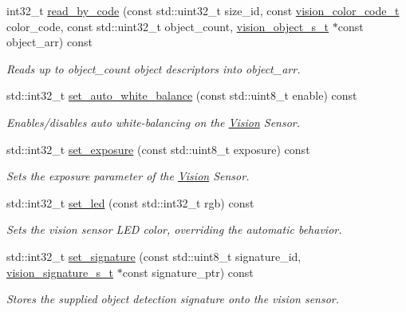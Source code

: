 \begin{DoxyCompactItemize}
int32\+\_\+t \hyperlink{classpros_1_1Vision_afbe909146f5cf396b322467885731d04}{read\+\_\+by\+\_\+code} (const std\+::uint32\+\_\+t size\+\_\+id, const \hyperlink{vision_8h_a71f2011a47e95558bb534b05c16c7f2b}{vision\+\_\+color\+\_\+code\+\_\+t} color\+\_\+code, const std\+::uint32\+\_\+t object\+\_\+count, \hyperlink{vision_8h_ae619120558539c13e53b5a6f42fb4375}{vision\+\_\+object\+\_\+s\+\_\+t} $\ast$const object\+\_\+arr) const
\begin{DoxyCompactList}\small\item\em Reads up to object\+\_\+count object descriptors into object\+\_\+arr. \end{DoxyCompactList}\item 
std\+::int32\+\_\+t \hyperlink{classpros_1_1Vision_a19cf2d7cf34b763b80da2c6511a61a49}{set\+\_\+auto\+\_\+white\+\_\+balance} (const std\+::uint8\+\_\+t enable) const
\begin{DoxyCompactList}\small\item\em Enables/disables auto white-\/balancing on the \hyperlink{classpros_1_1Vision}{Vision} Sensor. \end{DoxyCompactList}\item 
std\+::int32\+\_\+t \hyperlink{classpros_1_1Vision_a2ad6faaad1abb936f52022022611ac7f}{set\+\_\+exposure} (const std\+::uint8\+\_\+t exposure) const
\begin{DoxyCompactList}\small\item\em Sets the exposure parameter of the \hyperlink{classpros_1_1Vision}{Vision} Sensor. \end{DoxyCompactList}\item 
std\+::int32\+\_\+t \hyperlink{classpros_1_1Vision_ada3f1fdd2cc24c15af26bdd7c17bf604}{set\+\_\+led} (const std\+::int32\+\_\+t rgb) const
\begin{DoxyCompactList}\small\item\em Sets the vision sensor L\+ED color, overriding the automatic behavior. \end{DoxyCompactList}\item 
std\+::int32\+\_\+t \hyperlink{classpros_1_1Vision_a71c3c083ad5538a544e377ebc510cb75}{set\+\_\+signature} (const std\+::uint8\+\_\+t signature\+\_\+id, \hyperlink{vision_8h_a135c729c7277f6cc019c2924088a5fd5}{vision\+\_\+signature\+\_\+s\+\_\+t} $\ast$const signature\+\_\+ptr) const
\begin{DoxyCompactList}\small\item\em Stores the supplied object detection signature onto the vision sensor. \end{DoxyCompactList}\item 

\end{DoxyCompactItemize}
